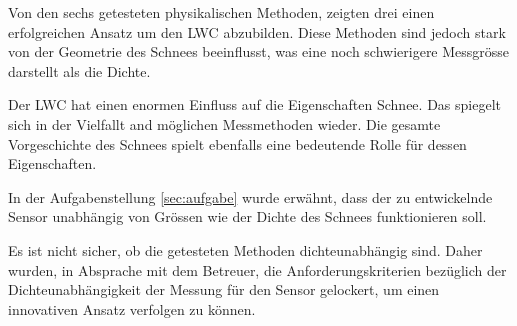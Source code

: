 
Von den sechs getesteten physikalischen Methoden, zeigten drei einen erfolgreichen Ansatz um den LWC abzubilden. Diese Methoden sind jedoch stark von der Geometrie des Schnees beeinflusst, was eine noch schwierigere Messgrösse darstellt als die Dichte.

Der LWC hat einen enormen Einfluss auf die Eigenschaften Schnee. Das spiegelt sich in der Vielfallt and möglichen Messmethoden wieder. Die gesamte Vorgeschichte des Schnees spielt ebenfalls eine bedeutende Rolle für dessen Eigenschaften.

In der Aufgabenstellung \ref{sec:aufgabe} wurde erwähnt, dass der zu entwickelnde Sensor unabhängig von Grössen wie der Dichte des Schnees funktionieren soll.


Es ist nicht sicher, ob die getesteten Methoden dichteunabhängig sind. Daher wurden, in Absprache mit dem Betreuer, die Anforderungskriterien bezüglich der Dichteunabhängigkeit der Messung für den Sensor gelockert, um einen innovativen Ansatz verfolgen zu können.
